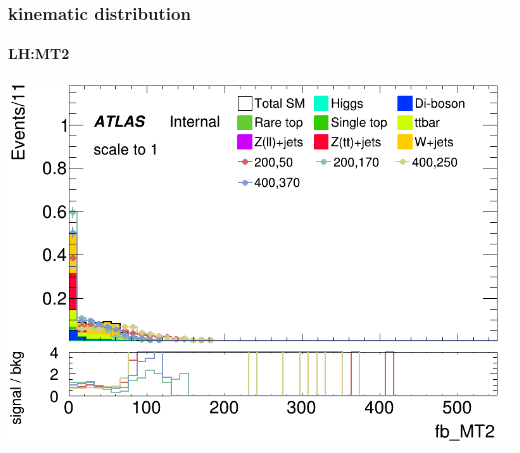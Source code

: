\documentclass[usenames,dvipsnames]{beamer}
\begin{document}
\begin{frame}
\frametitle{kinematic distribution}
\framesubtitle{LH:MT2}
    \begin{minipage}{0.32\textwidth}
        \centering
        \includegraphics[width=\textwidth]{graphics/LH_met_sig/LH_fb_MT2_norm.png}
    \end{minipage}
    \hfill
    \begin{minipage}{0.32\textwidth}
        \centering
        \setlength{\fboxsep}{0pt} %
        \setlength{\fboxrule}{1pt} %
    \end{minipage}
    \hfill
    \begin{minipage}{0.32\textwidth}
        \centering

\end{minipage}
\end{frame}
\end{document}
